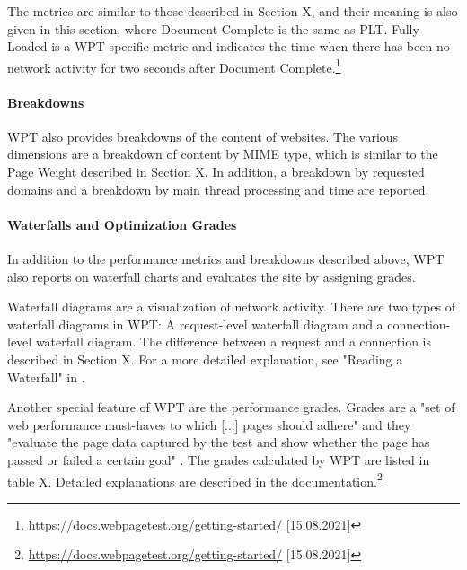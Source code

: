 The metrics are similar to those described in Section X, and their meaning is also given in this section, where Document Complete is the same as PLT.
Fully Loaded is a WPT-specific metric and indicates the time when there has been no network activity for two seconds after Document Complete.\footnote{\url{https://docs.webpagetest.org/getting-started/} [15.08.2021]}



\paragraph{Breakdowns} %

WPT also provides breakdowns of the content of websites.
The various dimensions are a breakdown of content by MIME type, which is similar to the Page Weight described in Section X.
In addition, a breakdown by requested domains and a breakdown by main thread processing and time are reported.



\paragraph{Waterfalls and Optimization Grades} %

In addition to the performance metrics and breakdowns described above, WPT also reports on waterfall charts and evaluates the site by assigning grades.


Waterfall diagrams are a visualization of network activity.
There are two types of waterfall diagrams in WPT:
A request-level waterfall diagram and a connection-level waterfall diagram.
The difference between a request and a connection is described in Section X.
For a more detailed explanation, see "Reading a Waterfall" in \cite{2016Viscomi}.




Another special feature of WPT are the performance grades.
Grades are a "set of web performance must-haves to which [...] pages should adhere" and they "evaluate the page data captured by the test and show whether the page has passed or failed a certain goal" \cite[p. 51]{2016Viscomi}.
The grades calculated by WPT are listed in table X.
Detailed explanations are described in the documentation.\footnote{\url{https://docs.webpagetest.org/getting-started/} [15.08.2021]}

